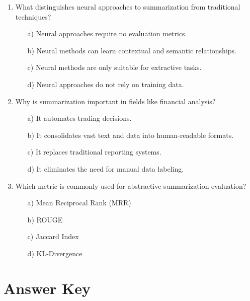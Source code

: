 \documentclass[8pt]{extarticle}
\begin{document}
\begin{multicols}{2}
\begin{enumerate}
\item What distinguishes neural approaches to summarization from traditional techniques?
\begin{itemize}
\item[a)] Neural approaches require no evaluation metrics.
\item[b)] Neural methods can learn contextual and semantic relationships.
\item[c)] Neural methods are only suitable for extractive tasks.
\item[d)] Neural approaches do not rely on training data.
\end{itemize}


\item Why is summarization important in fields like financial analysis?
\begin{itemize}
\item[a)] It automates trading decisions.
\item[b)] It consolidates vast text and data into human-readable formats.
\item[c)] It replaces traditional reporting systems.
\item[d)] It eliminates the need for manual data labeling.
\end{itemize}


\item Which metric is commonly used for abstractive summarization evaluation?
\begin{itemize}
\item[a)] Mean Reciprocal Rank (MRR)
\item[b)] ROUGE
\item[c)] Jaccard Index
\item[d)] KL-Divergence
\end{itemize}

\end{enumerate}

\end{multicols}

\newpage
\section*{Answer Key}
\end{document}
